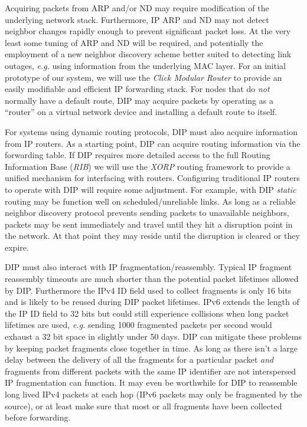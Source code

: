 \documentclass[10pt,letterpaper]{article}
\begin{document}
Acquiring packets from ARP and/or ND may require modification
of the underlying network stack. Furthermore, IP ARP and ND may
not detect neighbor changes rapidly enough to prevent significant packet
loss. At the very least some tuning of ARP and ND will be required,
and potentially the employment of a new neighbor discovery scheme
better suited to detecting link outages, {\em e.g.} using information
from the underlying MAC layer. For an initial prototype of our
system, we will use the {\em Click Modular Router}\cite{click:tocs00} 
to provide an easily modifiable and efficient IP forwarding stack.
For nodes that do {\em not} normally have a default route,
DIP may acquire packets by operating as a ``router'' on
a virtual network device and installing a default route to itself.

For systems using dynamic routing protocols, DIP must also acquire information
from IP routers. As a starting point, DIP can acquire routing information
via the forwarding table. If DIP requires more detailed access to the full
Routing Information Base ({\em RIB}) we will use the {\em XORP}\cite{xorp}
routing framework to provide a unified mechanism for interfacing with
routers. Configuring traditional IP routers to operate with DIP
will require some adjustment. For example, with DIP {\em static}
routing may be function well on scheduled/unreliable links.
As long as a reliable neighbor discovery protocol prevents sending
packets to unavailable neighbors, packets may be sent immediately
and travel until they hit a disruption point in the network. At
that point they may reside until the disruption is cleared or they expire.

DIP must also interact with IP fragmentation/reassembly. Typical IP
fragment reassembly timeouts are much shorter than the potential
packet lifetimes allowed by DIP. Furthermore the IPv4 ID field
used to collect fragments is only 16 bits and is likely to be reused
during DIP packet lifetimes. IPv6 extends the length of the IP ID field
to 32 bits but could still experience collisions when long packet
lifetimes are used, {\em e.g.} sending 1000 fragmented packets per second
would exhaust a 32 bit space in slightly under 50 days.
DIP can mitigate these problems by keeping packet fragments close together
in time. As long as there isn't a large delay between the delivery
of all the fragments for a particular packet {\em and} fragments
from different packets with the same IP identifier are not interspersed
IP fragmentation can function. It may even be worthwhile for DIP
to reassemble long lived IPv4 packets at each hop (IPv6 packets may
only be fragmented by the source), or at least make
sure that most or all fragments have been collected before forwarding.
\end{document}
